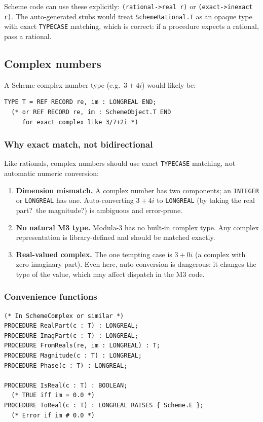 \documentclass[11pt]{article}
\begin{document}
Scheme code can use these explicitly: \texttt{(rational->real r)} or
\texttt{(exact->inexact r)}.  The auto-generated stubs would treat
\texttt{SchemeRational.T} as an opaque type with exact \texttt{TYPECASE}
matching, which is correct: if a procedure expects a rational, pass a
rational.

\subsection{Complex numbers}

A Scheme complex number type (e.g.\ $3+4i$) would likely be:

\begin{lstlisting}
TYPE T = REF RECORD re, im : LONGREAL END;
  (* or REF RECORD re, im : SchemeObject.T END
     for exact complex like 3/7+2i *)
\end{lstlisting}

\subsubsection{Why exact match, not bidirectional}

Like rationals, complex numbers should use exact \texttt{TYPECASE}
matching, not automatic numeric conversion:

\begin{enumerate}
\item \textbf{Dimension mismatch.}  A complex number has two
  components; an \texttt{INTEGER} or \texttt{LONGREAL} has one.
  Auto-converting $3+4i$ to \texttt{LONGREAL} (by taking the real
  part?\ the magnitude?) is ambiguous and error-prone.

\item \textbf{No natural M3 type.}  Modula-3 has no built-in complex
  type.  Any complex representation is library-defined and should be
  matched exactly.

\item \textbf{Real-valued complex.}  The one tempting case is $3+0i$
  (a complex with zero imaginary part).  Even here, auto-conversion
  is dangerous: it changes the type of the value, which may affect
  dispatch in the M3 code.
\end{enumerate}

\subsubsection{Convenience functions}

\begin{lstlisting}
(* In SchemeComplex or similar *)
PROCEDURE RealPart(c : T) : LONGREAL;
PROCEDURE ImagPart(c : T) : LONGREAL;
PROCEDURE FromReals(re, im : LONGREAL) : T;
PROCEDURE Magnitude(c : T) : LONGREAL;
PROCEDURE Phase(c : T) : LONGREAL;

PROCEDURE IsReal(c : T) : BOOLEAN;
  (* TRUE iff im = 0.0 *)
PROCEDURE ToReal(c : T) : LONGREAL RAISES { Scheme.E };
  (* Error if im # 0.0 *)
\end{lstlisting}
\end{document}
